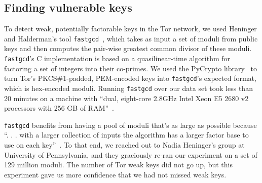 \subsection{Finding vulnerable keys}
\label{sec:vulnerable-keys}
To detect weak, potentially factorable keys in the Tor network, we used Heninger
and Halderman's tool \texttt{fastgcd}~\cite{fastgcd}, which takes as input a set of
moduli from public keys and then computes the pair-wise greatest common divisor
of these moduli.  \texttt{fastgcd}'s C implementation is based on a quasilinear-time
algorithm for factoring a set of integers into their co-primes.  We used the
PyCrypto library~\cite{pycrypto} to turn Tor's PKCS\#1-padded, PEM-encoded keys
into \texttt{fastgcd}'s expected format, which is hex-encoded moduli.  Running 
\texttt{fastgcd} over our data set took less than 20 minutes on 
a machine with ``dual, eight-core 2.8GHz Intel Xeon E5 2680 v2 processors with 
256 GB of RAM''~\cite{supercompy}.

\texttt{fastgcd} benefits from having a pool of moduli that's as large as possible because 
``. . . with a larger collection of inputs the algorithm has a larger 
factor base to use on each key''~\cite{Heninger2012a}.  
To that end, we reached out to Nadia Heninger's group at University of Pennsylvania, 
and they graciously re-ran our experiment on a set of 129 million 
moduli. The number of Tor weak keys did not go up, but 
this experiment gave us more confidence that we had not missed weak keys.
